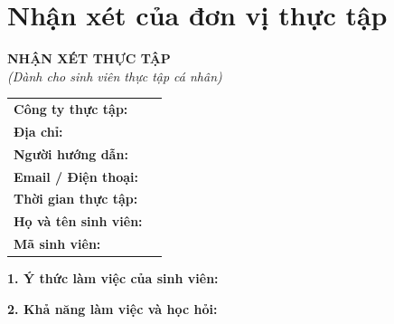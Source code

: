 %
\chapter*{Nhận xét của đơn vị thực tập}
\thispagestyle{empty}

\begin{center}
{\large\bfseries NHẬN XÉT THỰC TẬP}\\[0.2cm]
{\itshape (Dành cho sinh viên thực tập cá nhân)}
\end{center}

\vspace{0.6cm}

\noindent
\begin{tabular}{@{}p{4.2cm}p{11cm}@{}}
\textbf{Công ty thực tập:} & \dotfill \\[0.45cm]
\textbf{Địa chỉ:}          & \dotfill \\[0.45cm]
\textbf{Người hướng dẫn:}  & \dotfill \\[0.45cm]
\textbf{Email / Điện thoại:} & \dotfill \\[0.45cm]
\textbf{Thời gian thực tập:} & \dotfill \\[0.45cm]
\textbf{Họ và tên sinh viên:} & \dotfill \\[0.45cm]
\textbf{Mã sinh viên:}     & \dotfill \\
\end{tabular}

\vspace{0.8cm}

\noindent\textbf{1. Ý thức làm việc của sinh viên:}\par\vspace{0.15cm}
\answerline
\answerline

\noindent\textbf{2. Khả năng làm việc và học hỏi:}\par\vspace{0.15cm}
\answerline
\answerline

